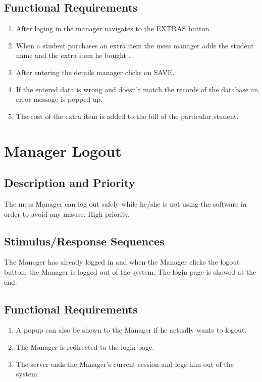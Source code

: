 \documentclass{scrreprt}
\begin{document}
\subsection{Functional Requirements}
\begin{enumerate}
\item After loging in the manager navigates to the EXTRAS  button.
\item When a student purchases an extra item the mess manager adds the student name and the extra item he bought .
\item After entering the details manager clicks on SAVE.
\item If the entered data is wrong and doesn't match the records of the database an error message is popped up. 
\item The cost of the extra item is added to the bill of the particular student. 
\end{enumerate}

\section{Manager Logout}

\subsection{Description and Priority}
The mess Manager can log out safely while he/she is not using the software in order to avoid any misuse. High priority.

\subsection{Stimulus/Response Sequences}
The Manager has already logged in and when the Manager clicks the logout button, the Manager is logged out of the system. The login page is showed at the end.

\subsection{Functional Requirements}
\begin{enumerate}
\item A popup can also be shown to the Manager if he actually wants to logout.
\item The Manager is redirected to the login page. 
\item The server ends the Manager's current session and logs him out of the system. 
\end{enumerate}
\end{document}
